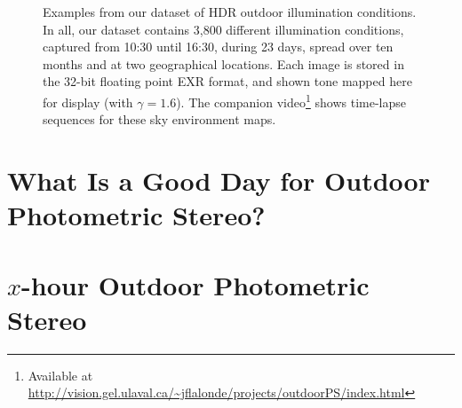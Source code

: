 \begin{figure}
\begin{tabular}{@{}rcccccccccccc@{}}
    \\

    \end{tabular}
    \caption[]{Examples from our dataset of HDR outdoor illumination conditions. In all, our dataset contains 3,800 different illumination conditions, captured from 10:30 until 16:30, during 23 days, spread over ten months and at two geographical locations. Each image is stored in the 32-bit floating point EXR format, and shown tone mapped here for display (with $\gamma = 1.6$). The companion video\footnote{Available at \url{http://vision.gel.ulaval.ca/~jflalonde/projects/outdoorPS/index.html}} shows time-lapse sequences for these sky environment maps.}
    \label{fig:database}
\end{figure}

\section{What Is a Good Day for Outdoor Photometric Stereo?}
\label{iccp15}



\section{$x$-hour Outdoor Photometric Stereo}
\label{3dv15}





